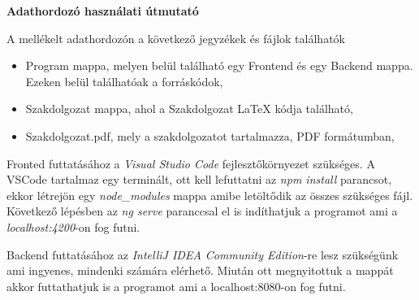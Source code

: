 \pagestyle{empty}

\noindent \textbf{\Large Adathordozó használati útmutató}

\vskip 1cm


A mellékelt adathordozón a következő jegyzékek és fájlok találhatók

\begin{itemize}
\item Program mappa, melyen belül található egy Frontend és egy Backend mappa. Ezeken belül találhatóak a forráskódok,
\item Szakdolgozat mappa, ahol a Szakdolgozat LaTeX kódja található,
\item Szakdolgozat.pdf, mely a szakdolgozatot tartalmazza, PDF formátumban,
\end{itemize}

Fronted futtatásához a \textit{Visual Studio Code} fejlesztőkörnyezet szükséges. A VSCode tartalmaz egy terminált, ott kell lefuttatni az \textit{npm install} parancsot, ekkor létrejön egy \textit{node\_modules} mappa amibe letöltődik az összes szükséges fájl. Következő lépésben az \textit{ng serve} paranccsal el is indíthatjuk a programot ami a \textit{localhost:4200}-on fog futni.

Backend futtatásához az \textit{IntelliJ IDEA Community Edition}-re lesz szükségünk ami ingyenes, mindenki számára elérhető. Miután ott megnyitottuk a mappát akkor futtathatjuk is a programot ami a {localhost:8080}-on fog futni.